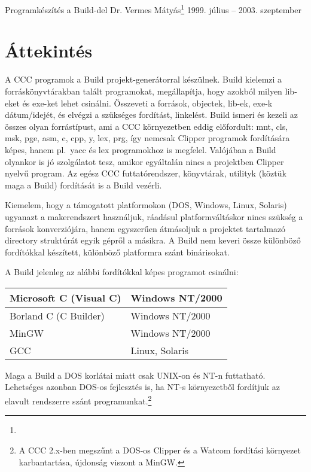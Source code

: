 
\pagetitle%
{Programkészítés a Build-del}%
{Dr. Vermes Mátyás\footnote{\ComFirm}}%
{1999. július -- 2003. szeptember}

\section{Áttekintés}

A CCC prog\-ramok a Build projekt-generátorral készülnek.
Build kielemzi a forráskönyvtárakban talált programokat, megállapítja, 
hogy azokból milyen lib-eket és exe-ket lehet csinálni.
Összeveti a források, objectek, lib-ek, exe-k dátum/idejét, 
és elvégzi a szükséges fordítást, linkelést. Build ismeri és kezeli
az összes olyan forrástípust, ami a CCC környezetben eddig előfordult:
mnt, cls, msk, pge,  asm, c, cpp, y, lex, prg,
így nemcsak Clipper programok fordítására képes, 
hanem pl.\ yacc és lex programokhoz is megfelel. 
Valójában a Build olyankor is jó szolgálatot tesz, 
amikor egyáltalán nincs a projektben Clipper nyelvű program.
Az egész CCC futtatórendszer, könyvtárak, utilityk (köztük maga a Build) 
fordítását is a Build vezérli.

Kiemelem, hogy a támogatott platformokon (DOS, Windows, Linux, Solaris) 
ugyanazt a makerendszert használjuk, ráadásul platformváltáskor
nincs szükség a források konverziójára, hanem egyszerűen átmásoljuk 
a projektet tartalmazó directory struktúrát egyik gépről a másikra. 
A Build nem keveri össze különböző fordítókkal készített,
különböző platformra szánt binárisokat.


A Build jelenleg az alábbi fordítókkal képes programot csinálni:

\begin{center}
\begin{tabular}{|l|l|} \hline
Microsoft C (Visual C)   & Windows NT/2000  \\ \hline 
Borland C (C Builder)    & Windows NT/2000  \\ \hline 
MinGW                    & Windows NT/2000  \\ \hline 
GCC                      & Linux, Solaris   \\ \hline  
\end{tabular}
\end{center}

Maga a Build a DOS korlátai miatt csak UNIX-on és NT-n futtatható.
Lehetséges azonban DOS-os fejlesztés is, ha NT-s környezetből
fordítjuk az elavult rendszerre szánt programunkat.\footnote{
A CCC 2.x-ben megszűnt a DOS-os Clipper és a Watcom fordítási
környezet karbantartása, újdonság viszont a MinGW.}


